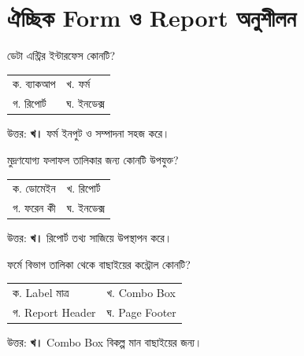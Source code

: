\section*{ঐচ্ছিক Form ও Report অনুশীলন}


\item \begin{minipage}[t]{\linewidth}
ডেটা এন্ট্রির ইন্টারফেস কোনটি?
\par
\begin{tabularx}{\linewidth}{@{}X X@{}}
ক. ব্যাকআপ & খ. ফর্ম \\
গ. রিপোর্ট & ঘ. ইনডেক্স \\
\end{tabularx}
\end{minipage}

\par উত্তর: \textbf{খ।} ফর্ম ইনপুট ও সম্পাদনা সহজ করে।


\item \begin{minipage}[t]{\linewidth}
মুদ্রণযোগ্য ফলাফল তালিকার জন্য কোনটি উপযুক্ত?
\par
\begin{tabularx}{\linewidth}{@{}X X@{}}
ক. ডোমেইন & খ. রিপোর্ট \\
গ. ফরেন কী & ঘ. ইনডেক্স \\
\end{tabularx}
\end{minipage}

\par উত্তর: \textbf{খ।} রিপোর্ট তথ্য সাজিয়ে উপস্থাপন করে।


\item \begin{minipage}[t]{\linewidth}
ফর্মে বিভাগ তালিকা থেকে বাছাইয়ের কন্ট্রোল কোনটি?
\par
\begin{tabularx}{\linewidth}{@{}X X@{}}
ক. Label মাত্র & খ. Combo Box \\
গ. Report Header & ঘ. Page Footer \\
\end{tabularx}
\end{minipage}

\par উত্তর: \textbf{খ।} Combo Box বিকল্প মান বাছাইয়ের জন্য।


